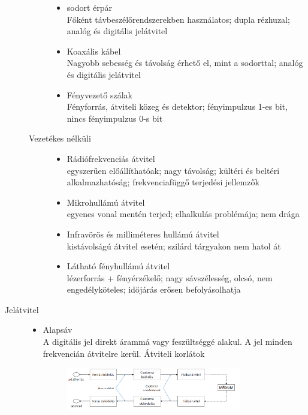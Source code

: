 \documentclass[margin=0px]{article}
\begin{document}
\begin{description}
\begin{description}
\begin{itemize}
							\item sodort érpár \\
							Főként távbeszélőrendszerekben használatos; dupla rézhuzal; analóg és digitális jelátvitel
							\item Koaxális kábel\\
							Nagyobb sebesség és távolság érhető el, mint a sodorttal; analóg és
							digitális jelátvitel
							\item Fényvezető szálak\\
							Fényforrás, átviteli közeg és detektor; fényimpulzus 1-es bit, nincs
							fényimpulzus 0-s bit
						\end{itemize}
					\item[Vezetékes nélküli] \hfill
					\begin{itemize}
					\item Rádiófrekvenciás átvitel \\
					egyszerűen előállíthatóak; nagy távolság; kültéri és beltéri alkalmazhatóság; frekvenciafüggő terjedési jellemzők
					\item Mikrohullámú átvitel\\
					egyenes vonal mentén terjed; elhalkulás problémája; nem drága
					\item Infravörös és milliméteres hullámú átvitel \\
					kistávolságú átvitel esetén; szilárd tárgyakon nem hatol át
					\item Látható fényhullámú átvitel\\ 
					lézerforrás + fényérzékelő; nagy sávszélesség, olcsó, nem engedélyköteles; időjárás erősen befolyásolhatja
					\end{itemize}
				\end{description}
			\item[Jelátvitel] \hfill
				\begin{itemize}
					\item Alapsáv \\
						A digitális jel direkt árammá vagy feszültséggé alakul. A jel minden frekvencián átvitelre kerül. Átviteli korlátok
						\begin{figure}[H]
							\centering
							\includegraphics[width=0.8\textwidth]{img/alapsav.png}

\end{figure}
\end{itemize}
\end{description}
\end{document}
